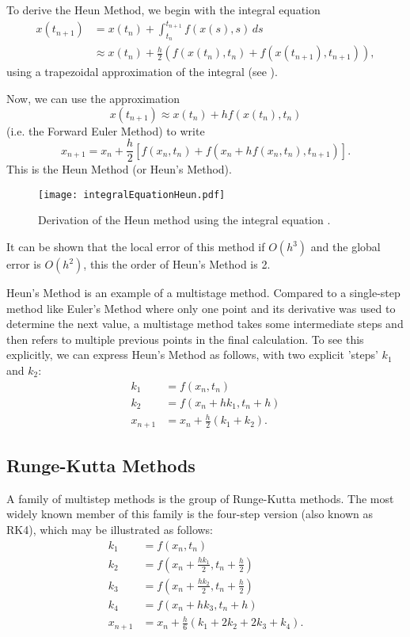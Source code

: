 To derive the Heun Method, we begin with the integral equation
\begin{align*}
	x(t_{n+1}) &= x(t_n) + \int_{t_n}^{t_{n+1}} f(x(s), s) \,ds \\
	&\approx x(t_n) + \frac{h}{2} (f(x(t_n), t_n) + f(x(t_{n+1}), t_{n+1})),
\end{align*}
using a trapezoidal approximation of the integral (see ).

Now, we can use the approximation
\[
x(t_{n+1}) \approx x(t_n) + h f(x(t_n), t_n)
\]
(i.e. the Forward Euler Method) to write
\begin{equation}
	x_{n+1} = x_n + \frac{h}{2}\left[f(x_n,t_n) + f(x_n + hf(x_n,t_n), t_{n+1})\right].
\end{equation}
This is the Heun Method (or Heun's Method).

\begin{figure}[!ht]
	\centering
	\texttt{[image: integralEquationHeun.pdf]}
	\caption{Derivation of the Heun method using the integral equation \cite[Figure 8.2.1]{boyce}.}
	\label{fig:heunint}
\end{figure}

\begin{remark}
	It can be shown that the local error of this method if $O(h^3)$ and the global error is $O(h^2)$, this the order of Heun's Method is 2.
\end{remark}

Heun's Method is an example of a multistage method. Compared to a single-step method like Euler's Method where only one point and its derivative was used to determine the next value, a multistage method takes some intermediate steps and then refers to multiple previous points in the final calculation. To see this explicitly, we can express Heun's Method as follows, with two explicit 'steps' $k_1$ and $k_2$:
\begin{align*}
	k_1 &= f(x_n, t_n) \\
	k_2 &= f(x_n + hk_1, t_n+h) \\
	x_{n+1} &= x_n + \frac{h}{2}(k_1 + k_2).
\end{align*}

\subsection{Runge-Kutta Methods}

A family of multistep methods is the group of Runge-Kutta methods. The most widely known member of this family is the four-step version (also known as RK4), which may be illustrated as follows:
\begin{align*}
	k_1 &= f(x_n, t_n) \\
	k_2 &= f(x_n + \frac{hk_1}{2}, t_n + \frac{h}{2}) \\
	k_3 &= f(x_n + \frac{hk_2}{2}, t_n + \frac{h}{2}) \\
	k_4 &= f(x_n + hk_3, t_n + h) \\
	x_{n+1} &= x_n + \frac{h}{6} (k_1 + 2k_2 + 2k_3 + k_4).
\end{align*}

